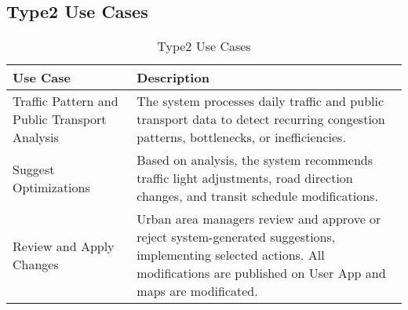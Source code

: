 \documentclass[a4paper,12pt]{article}
\begin{document}
\subsection*{Type2 Use Cases}
\begin{table}[h!]
\centering
\begin{tabular}{|p{4.5cm}|p{8.5cm}|}
\hline
\textbf{Use Case} & \textbf{Description} \\
\hline
Traffic Pattern and Public Transport Analysis & The system processes daily traffic and public transport data to detect recurring congestion patterns, bottlenecks, or inefficiencies. \\
\hline
Suggest Optimizations & Based on analysis, the system recommends traffic light adjustments, road direction changes, and transit schedule modifications. \\
\hline
Review and Apply Changes & Urban area managers review and approve or reject system-generated suggestions, implementing selected actions. All modifications are published on User App and maps are modificated. \\
\hline
\end{tabular}
\caption{Type2 Use Cases}
\end{table}
\end{document}

